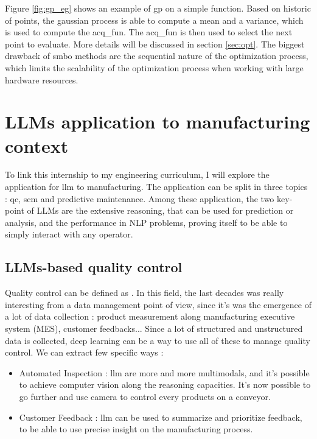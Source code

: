 Figure \ref{fig:gp_eg} shows an example of \acrfull{gp} on a simple function. Based on historic of points, the gaussian process is able to compute a mean and a variance, which is used to compute the \gls{acq_fun}. The \gls{acq_fun} is then used to select the next point to evaluate. More details will be discussed in section \ref{sec:opt}. The biggest drawback of \acrshort{smbo} methods are the sequential nature of the optimization process, which limits the scalability of the optimization process when working with large hardware resources.



\section{LLMs application to manufacturing context}
\label{sec:llm_manufacturing}
To link this internship to my engineering curriculum, I will explore the application for \acrshort{llm} to manufacturing. The application can be split in three topics : \acrfull{qc}, \acrfull{scm} and predictive maintenance. Among these application, the two key-point of LLMs are the extensive reasoning, that can be used for prediction or analysis, and the performance in NLP problems, proving itself to be able to simply interact with any operator.

\subsection{LLMs-based quality control}
\label{sec:llm_quality}
Quality control can be defined as  \cite{noauthor_what_nodate}. In this field, the last decades was really interesting from a data management point of view, since it's was the emergence of a lot of data collection : product measurement along manufacturing executive system (MES), customer feedbacks... Since a lot of structured and unstructured data is collected, deep learning can be a way to use all of these to manage quality control. We can extract few specific ways : 

\begin{itemize}
    \item Automated Inspection : \acrshort{llm} are more and more multimodals, and it's possible to achieve computer vision along the reasoning capacities. It's now possible to go further and use camera to control every products on a conveyor. 
    \item Customer Feedback : \acrshort{llm} can be used to summarize and prioritize feedback, to be able to use precise insight on the manufacturing process.
\end{itemize}

